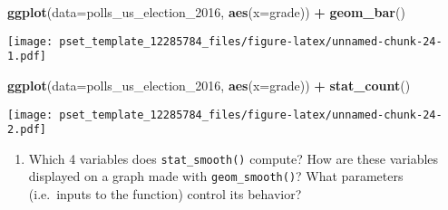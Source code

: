 \documentclass[
]{article}
\newenvironment{Shaded}{\begin{snugshade}}{\end{snugshade}}
\newcommand{\DataTypeTok}[1]{\textcolor[rgb]{0.13,0.29,0.53}{#1}}
\newcommand{\DecValTok}[1]{\textcolor[rgb]{0.00,0.00,0.81}{#1}}
\newcommand{\KeywordTok}[1]{\textcolor[rgb]{0.13,0.29,0.53}{\textbf{#1}}}
\newcommand{\NormalTok}[1]{#1}
\newcommand{\OperatorTok}[1]{\textcolor[rgb]{0.81,0.36,0.00}{\textbf{#1}}}
\newcommand{\StringTok}[1]{\textcolor[rgb]{0.31,0.60,0.02}{#1}}
\providecommand{\tightlist}{%
  \setlength{\itemsep}{0pt}\setlength{\parskip}{0pt}}
\begin{document}
\begin{Shaded}
\begin{Highlighting}[]
\KeywordTok{ggplot}\NormalTok{(}\DataTypeTok{data=}\NormalTok{polls_us_election_}\DecValTok{2016}\NormalTok{, }\KeywordTok{aes}\NormalTok{(}\DataTypeTok{x=}\NormalTok{grade)) }\OperatorTok{+}\StringTok{ }\KeywordTok{geom_bar}\NormalTok{()}
\end{Highlighting}
\end{Shaded}

\texttt{[image: pset\_template\_12285784\_files/figure-latex/unnamed-chunk-24-1.pdf]}

\begin{Shaded}
\begin{Highlighting}[]
\KeywordTok{ggplot}\NormalTok{(}\DataTypeTok{data=}\NormalTok{polls_us_election_}\DecValTok{2016}\NormalTok{, }\KeywordTok{aes}\NormalTok{(}\DataTypeTok{x=}\NormalTok{grade)) }\OperatorTok{+}\StringTok{ }\KeywordTok{stat_count}\NormalTok{()}
\end{Highlighting}
\end{Shaded}

\texttt{[image: pset\_template\_12285784\_files/figure-latex/unnamed-chunk-24-2.pdf]}

\begin{enumerate}
\def\labelenumi{\arabic{enumi}.}
\tightlist
\item
  Which 4 variables does \texttt{stat\_smooth()} compute? How are these
  variables displayed on a graph made with \texttt{geom\_smooth()}? What
  parameters (i.e.~inputs to the function) control its behavior?
\end{enumerate}
\end{document}
